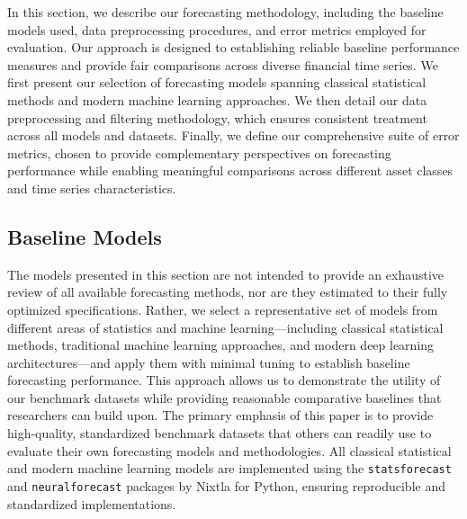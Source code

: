 \documentclass{article}
\begin{document}

In this section, we describe our forecasting methodology, including the baseline models used, data preprocessing procedures, and error metrics employed for evaluation. Our approach is designed to establishing reliable baseline performance measures and provide fair comparisons across diverse financial time series. We first present our selection of forecasting models spanning classical statistical methods and modern machine learning approaches. We then detail our data preprocessing and filtering methodology, which ensures consistent treatment across all models and datasets. Finally, we define our comprehensive suite of error metrics, chosen to provide complementary perspectives on forecasting performance while enabling meaningful comparisons across different asset classes and time series characteristics.

\subsection{Baseline Models}

The models presented in this section are not intended to provide an exhaustive review of all available forecasting methods, nor are they estimated to their fully optimized specifications. Rather, we select a representative set of models from different areas of statistics and machine learning---including classical statistical methods, traditional machine learning approaches, and modern deep learning architectures---and apply them with minimal tuning to establish baseline forecasting performance. This approach allows us to demonstrate the utility of our benchmark datasets while providing reasonable comparative baselines that researchers can build upon. The primary emphasis of this paper is to provide high-quality, standardized benchmark datasets that others can readily use to evaluate their own forecasting models and methodologies. All classical statistical and modern machine learning models are implemented using the \texttt{statsforecast} and \texttt{neuralforecast} packages by Nixtla for Python, ensuring reproducible and standardized implementations.
\end{document}
